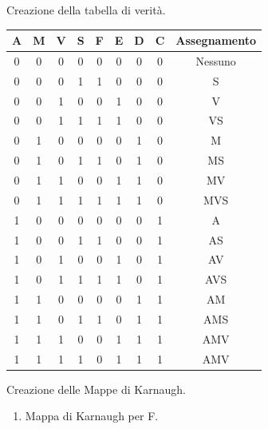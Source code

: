 \begin{questions}
{\begin{table}[h!]
        \label{tab:codifica}
    \end{table}

}

\newpage
    \begin{solution}
        Creazione della tabella di verità.
        
            \begin{center}
              \begin{tabular}{cccc|cccc|c}
                A & M & V & S 	& F & E & D & C & Assegnamento\\
                \hline
                0 & 0 & 0 & 0 	& 0 & 0 & 0 & 0 & Nessuno\\
                0 & 0 & 0 & 1 	& 1 & 0 & 0 & 0 & S\\
                0 & 0 & 1 & 0 	& 0 & 1 & 0 & 0 & V\\
                0 & 0 & 1 & 1 	& 1 & 1 & 0 & 0 & VS\\
                0 & 1 & 0 & 0 	& 0 & 0 & 1 & 0 & M\\ 
                0 & 1 & 0 & 1 	& 1 & 0 & 1 & 0 & MS\\
                0 & 1 & 1 & 0 	& 0 & 1 & 1 & 0 & MV\\
                0 & 1 & 1 & 1 	& 1 & 1 & 1 & 0 & MVS\\
                1 & 0 & 0 & 0 	& 0 & 0 & 0 & 1 & A\\
                1 & 0 & 0 & 1 	& 1 & 0 & 0 & 1 & AS\\
                1 & 0 & 1 & 0 	& 0 & 1 & 0 & 1 & AV\\
                1 & 0 & 1 & 1 	& 1 & 1 & 0 & 1 & AVS\\
                1 & 1 & 0 & 0 	& 0 & 0 & 1 & 1 & AM\\
                1 & 1 & 0 & 1 	& 1 & 0 & 1 & 1 & AMS\\
                1 & 1 & 1 & 0 	& 0 & 1 & 1 & 1 & AMV\\
                1 & 1 & 1 & 1 	& 0 & 1 & 1 & 1 & AMV\\
              \end{tabular}
            \end{center}
            
        \vspace{-1em}
            
            Creazione delle Mappe di Karnaugh.
            \begin{enumerate}
                    \item Mappa di Karnaugh per F.
                    

\end{enumerate}
\end{solution}
\end{questions}
